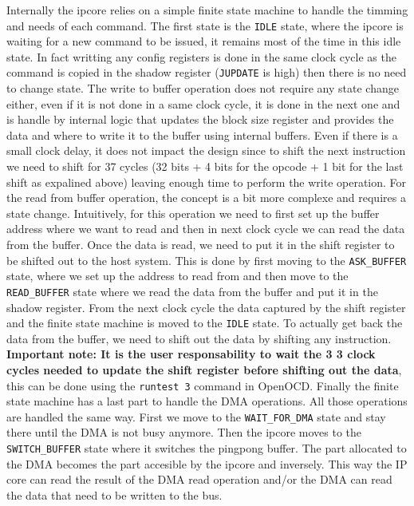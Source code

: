 \documentclass[a4paper,11pt,oneside]{report}
\begin{document}
Internally the ipcore relies on a simple finite state machine to handle the timming and needs of each command.
The first state is the \texttt{IDLE} state, where the ipcore is waiting for a new command to be issued, it remains most of the time in this idle state. In fact writting any config registers
is done in the same clock cycle as the command is copied in the shadow register (\texttt{JUPDATE} is high) then there is no need to change state.
The write to buffer operation does not require any state change either, even if it is not done in a same clock cycle, it is done in the next one and is handle by 
internal logic that updates the block size register and provides the data and where to write it to the buffer using internal buffers.
Even if there is a small clock delay, it does not impact the design since to shift the next instruction we need to shift for 37 cycles (32 bits + 4 bits for the opcode + 1 bit for the last shift as expalined above) 
leaving enough time to perform the write operation.
For the read from buffer operation, the concept is a bit more complexe and requires a state change. Intuitively, for this operation we need to first set up the buffer address where we want to read
and then in next clock cycle we can read the data from the buffer. Once the data is read, we need to put it in the shift register to be shifted out to the host system.
This is done by first moving to the \texttt{ASK\_BUFFER} state, where we set up the address to read from and then move to the \texttt{READ\_BUFFER} state where we read the data from the buffer and put it in the shadow register.
From the next clock cycle the data captured by the shift register and the finite state machine is moved to the \texttt{IDLE} state.
To actually get back the data from the buffer, we need to shift out the data by shifting any instruction. \textbf{Important note: It is the user responsability to wait the 3
3 clock cycles needed to update the shift register before shifting out the data}, this can be done using the \texttt{runtest 3} command in OpenOCD. 
Finally the finite state machine has a last part to handle the DMA operations. All those operations are handled the same way.
First we move to the \texttt{WAIT\_FOR\_DMA} state and stay there until the DMA is not busy anymore.
Then the ipcore moves to the \texttt{SWITCH\_BUFFER} state where it switches the pingpong buffer. The part allocated to the DMA becomes the part accesible by the ipcore and inversely.
This way the IP core can read the result of the DMA read operation and/or the DMA can read the data that need to be written to the bus.
\end{document}

